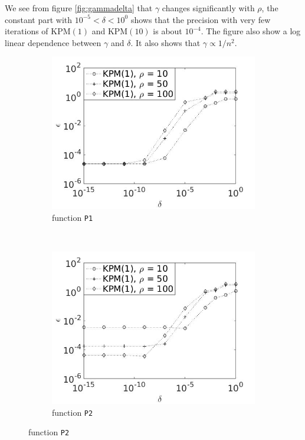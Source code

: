 We see from figure \ref{fig:gammadelta} that $\gamma$ changes significantly with $\rho$, the constant part with $ 10^{-5}<\delta< {10^0} $ shows that the precision with very few iterations of KPM$(1)$ and KPM$(10)$ is about $10^{-4}$. The figure also show a log linear dependence between $\gamma$ and $\delta$. It also shows that $\gamma \propto 1/n^2$. 
\begin{figure}[H]
        \centering
        \begin{subfigure}[b]{0.45\textwidth}
                \includegraphics[width=\textwidth]{fig/s15errvstol1m}
                \caption{function \texttt{P1}}
                \label{fig:epsilondelta1}
        \end{subfigure}
~
        \begin{subfigure}[b]{0.45\textwidth}
                \includegraphics[width=\textwidth]{fig/s16errvstol2m}
                \caption{ function \texttt{P2}}
                \label{fig:epsilondelta2}
        \end{subfigure}
        

\end{figure}
